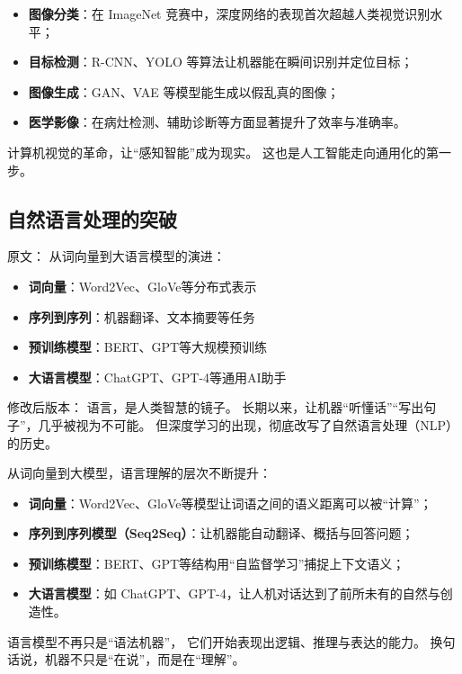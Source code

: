 \begin{itemize}
\item \textbf{图像分类}：在 ImageNet 竞赛中，深度网络的表现首次超越人类视觉识别水平；
\item \textbf{目标检测}：R-CNN、YOLO 等算法让机器能在瞬间识别并定位目标；
\item \textbf{图像生成}：GAN、VAE 等模型能生成以假乱真的图像；
\item \textbf{医学影像}：在病灶检测、辅助诊断等方面显著提升了效率与准确率。
\end{itemize}

计算机视觉的革命，让“感知智能”成为现实。  
这也是人工智能走向通用化的第一步。



\subsection{自然语言处理的突破}

原文：
从词向量到大语言模型的演进：

\begin{itemize}
\item \textbf{词向量}：Word2Vec、GloVe等分布式表示
\item \textbf{序列到序列}：机器翻译、文本摘要等任务
\item \textbf{预训练模型}：BERT、GPT等大规模预训练
\item \textbf{大语言模型}：ChatGPT、GPT-4等通用AI助手
\end{itemize}
修改后版本：
语言，是人类智慧的镜子。  
长期以来，让机器“听懂话”“写出句子”，几乎被视为不可能。  
但深度学习的出现，彻底改写了自然语言处理（NLP）的历史。

从词向量到大模型，语言理解的层次不断提升：

\begin{itemize}
\item \textbf{词向量}：Word2Vec、GloVe等模型让词语之间的语义距离可以被“计算”；
\item \textbf{序列到序列模型（Seq2Seq）}：让机器能自动翻译、概括与回答问题；
\item \textbf{预训练模型}：BERT、GPT等结构用“自监督学习”捕捉上下文语义；
\item \textbf{大语言模型}：如 ChatGPT、GPT-4，让人机对话达到了前所未有的自然与创造性。
\end{itemize}

语言模型不再只是“语法机器”，  
它们开始表现出逻辑、推理与表达的能力。  
换句话说，机器不只是“在说”，而是在“理解”。



